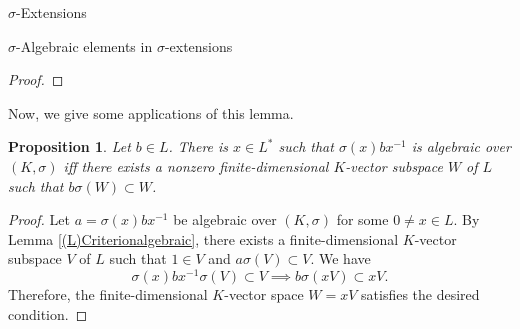 \documentclass[11pt,a4paper]{article}
\theoremstyle{theorem}
\newtheorem{proposition}[theorem]{Proposition}
\numberwithin{equation}{section}
\newcommand{\s}{\sigma}
\begin{document}
\begin{section}{$\s$-Extensions}
\begin{subsection}{$\s$-Algebraic elements in $\s$-extensions }
\begin{proof}
	\end{proof}	
Now, we give some applications of this lemma. 
	\begin{proposition}
		Let $b\in L$. There is $x\in L^*$ such that $\s(x)bx^{-1}$ is algebraic over $(K,\s)$ iff there exists a nonzero finite-dimensional $K$-vector subspace $W$ of $L$ such that  $b\s(W)\subset W$.
	\end{proposition}
	\begin{proof}
		Let $a=\s(x)bx^{-1}$ be algebraic over $(K,\s)$ for some $0\neq x\in L$. By Lemma \ref{(L)Criterionalgebraic}, there exists a finite-dimensional $K$-vector subspace $V$ of $L$ such that $1\in V$ and $a\s(V)\subset V$. We have
		$$\s(x)bx^{-1}\s(V)\subset V\implies b\s(xV)\subset xV.$$
		Therefore, the finite-dimensional $K$-vector space $W=xV$ satisfies the desired condition. 
		

\end{proof}
\end{subsection}
\end{section}
\end{document}
